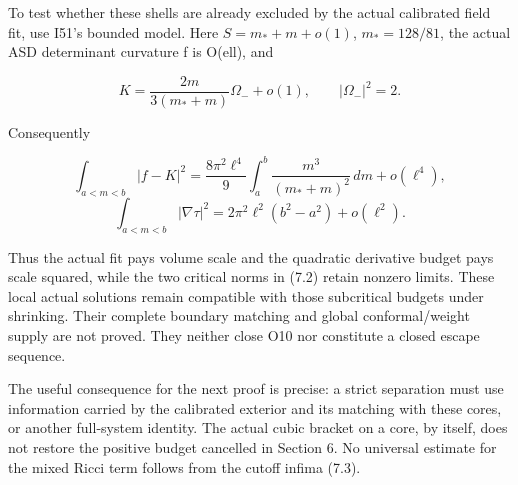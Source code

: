 \documentclass[
  10pt,
]{article}
\begin{document}
To test whether these shells are already excluded by the actual
calibrated field fit, use I51's bounded model. Here \(S=m_*+m+o(1)\),
\(m_*=128/81\), the actual ASD determinant curvature f is O(ell), and

\[
 K=\frac{2m}{3(m_*+m)}\Omega_-+o(1),\qquad |\Omega_-|^2=2.
\]

Consequently

\[
 \int_{a<m<b}|f-K|^2
  =\frac{8\pi^2\ell^4}{9}\int_a^b\frac{m^3}{(m_*+m)^2}\,dm
     +o(\ell^4),
\] \[
 \int_{a<m<b}|\nabla\tau|^2
       =2\pi^2\ell^2(b^2-a^2)+o(\ell^2). \tag{7.4}
\]

Thus the actual fit pays volume scale and the quadratic derivative
budget pays scale squared, while the two critical norms in (7.2) retain
nonzero limits. These local actual solutions remain compatible with
those subcritical budgets under shrinking. Their complete boundary
matching and global conformal/weight supply are not proved. They neither
close O10 nor constitute a closed escape sequence.

The useful consequence for the next proof is precise: a strict
separation must use information carried by the calibrated exterior and
its matching with these cores, or another full-system identity. The
actual cubic bracket on a core, by itself, does not restore the positive
budget cancelled in Section 6. No universal estimate for the mixed Ricci
term follows from the cutoff infima (7.3).
\end{document}
